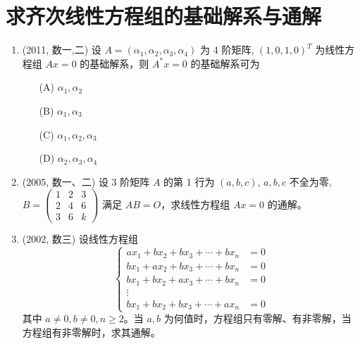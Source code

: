 \documentclass[12pt, a4paper, oneside, UTF8]{ctexbook}
\begin{document}
\section{求齐次线性方程组的基础解系与通解}

\begin{enumerate}[label=\arabic*.,start=3]
    \item (2011, 数一,二) 设 $A = (\alpha_1, \alpha_2, \alpha_3, \alpha_4)$ 为 4 阶矩阵, $(1,0,1,0)^T$ 为线性方程组 $Ax = 0$ 的基础解系，则 $A^* x = 0$ 的基础解系可为
    \begin{enumerate}
        \item [(A)] $\alpha_1, \alpha_2$
        \item [(B)] $\alpha_1, \alpha_3$
        \item [(C)] $\alpha_1, \alpha_2, \alpha_3$
        \item [(D)] $\alpha_2, \alpha_3, \alpha_4$
    \end{enumerate}
    
    \begin{solution}
    \newpage
    \end{solution}
    
    \item (2005, 数一、二) 设 3 阶矩阵 $A$ 的第 1 行为 $(a, b, c)$, $a, b, c$ 不全为零, 
    $B = \begin{pmatrix} 1 & 2 &3 \\ 2 & 4 & 6 \\ 3 & 6 & k \end{pmatrix}$ 满足 $AB = O$，求线性方程组 $Ax = 0$ 的通解。
    
    \begin{solution}
    \newpage
    \end{solution}
    
    \item (2002, 数三) 设线性方程组
    \[
    \begin{cases}
    a x_1 + b x_2 + b x_3 + \cdots + b x_n &= 0 \\
    b x_1 + a x_2 + b x_3 + \cdots + b x_n &= 0 \\
    b x_1 + b x_2 + a x_3 + \cdots + b x_n &= 0 \\
    \vdots \\
    b x_1 + b x_2 + b x_3 + \cdots + a x_n &= 0
    \end{cases}
    \]
    其中 $a \neq 0, b \neq 0, n \geq 2$。当 $a, b$ 为何值时，方程组只有零解、有非零解，当方程组有非零解时，求其通解。
    
    \begin{solution}
    \newpage
    \end{solution}
\end{enumerate}
\end{document}
